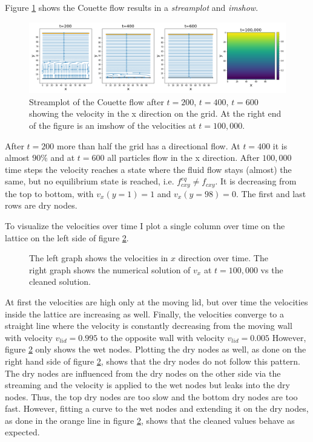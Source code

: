 Figure \ref{fig:m4-1-streamplot} shows the Couette flow results in a \textit{streamplot} and \textit{imshow}.
\begin{figure}[ht]
\centering
\includegraphics[width=\columnwidth]{milestones/final/img/m4-1-streamplot.png}
\vspace*{-4mm}
\caption[Couette flow ]{Streamplot of the Couette flow after $t=200$, $t=400$, $t=600$ showing the velocity in the x direction on the grid. At the right end of the figure is an imshow of the velocities at $t=100,000$.}
\label{fig:m4-1-streamplot}
\end{figure}
After $t=200$ more than half the grid has a directional flow. At $t=400$ it is almost $90\%$ and at $t=600$ all particles flow in the x direction. 
After $100,000$ time steps the velocity reaches a state where the fluid flow stays (almost) the same, but no equilibrium state is reached, i.e. $f^{eq}_{cxy}\neq f_{cxy}$. 
It is decreasing from the top to bottom, with $v_{x}(y=1)=1$ and $v_{x}(y=98)=0$. 
The first and last rows are dry nodes.

To visualize the velocities over time I plot a single column over time on the lattice on the left side of figure \ref{fig:m4-1-velocities-over-time}.
\begin{figure}[ht]
\centering
\resizebox{\columnwidth}{!}{\large}
\caption[Column velocities over time]{The left graph shows the velocities in $x$ direction over time. The right graph shows the numerical solution of $v_{x}$ at $t=100,000$ vs the cleaned solution.}
\label{fig:m4-1-velocities-over-time}
\end{figure}
At first the velocities are high only at the moving lid, but over time the velocities inside the lattice are increasing as well.
Finally, the velocities converge to a straight line where the velocity is constantly decreasing from the moving wall with velocity $v_{lid}=0.995$ to the opposite wall with velocity $v_{lid}=0.005$
However, figure \ref{fig:m4-1-velocities-over-time} only shows the wet nodes.
Plotting the dry nodes as well, as done on the right hand side of figure \ref{fig:m4-1-velocities-over-time}, shows that the dry nodes do not follow this pattern. 
The dry nodes are influenced from the dry nodes on the other side via the streaming and the velocity is applied to the wet nodes but leaks into the dry nodes.
Thus, the top dry nodes are too slow and the bottom dry nodes are too fast.
However, fitting a curve to the wet nodes and extending it on the dry nodes, as done in the orange line in figure \ref{fig:m4-1-velocities-over-time}, shows that the cleaned values behave as expected.

